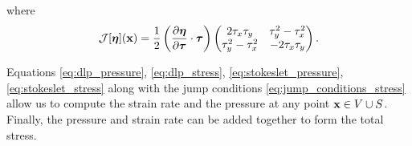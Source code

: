 where
\[ \mathcal{J}[\bm{\eta}]({\mathbf{x}}) = \frac{1}{2}\left(\frac{\partial\bm{\eta}}{\partial\bm{\tau}}\cdot\bm{\tau}\right)\begin{pmatrix} 2\tau_x\tau_y & \tau_y^2 - \tau_x^2\\ \tau_y^2 - \tau_x^2 & -2\tau_x\tau_y\end{pmatrix}.\]

Equations \eqref{eq:dlp_pressure}, \eqref{eq:dlp_stress}, \eqref{eq:stokeslet_pressure}, \eqref{eq:stokeslet_stress} along with the jump conditions \eqref{eq:jump_conditions_stress} allow us to compute the strain rate and the pressure at any point ${\mathbf{x}} \in V\cup S$. Finally, the pressure and strain rate can be added together to form the total stress. 


 
